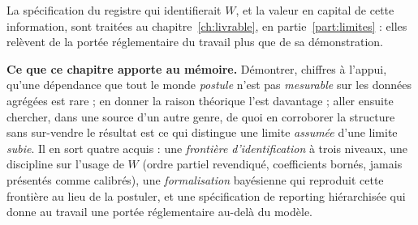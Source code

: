 La spécification du registre qui identifierait $W$, et la valeur en capital de cette
information, sont traitées au chapitre~\ref{ch:livrable}, en partie~\ref{part:limites} : elles
relèvent de la portée réglementaire du travail plus que de sa démonstration.

\begin{cle}
\textbf{Ce que ce chapitre apporte au mémoire.} Démontrer, chiffres à l'appui, qu'une dépendance
que tout le monde \emph{postule} n'est pas \emph{mesurable} sur les données agrégées est rare ;
en donner la raison théorique l'est davantage ; aller ensuite chercher, dans une source d'un
autre genre, de quoi en corroborer la structure sans sur-vendre le résultat est ce qui distingue
une limite \emph{assumée} d'une limite \emph{subie}. Il en sort quatre acquis : une
\emph{frontière d'identification} à trois niveaux, une discipline sur l'usage de $W$
(ordre partiel revendiqué, coefficients bornés, jamais présentés comme calibrés), une
\emph{formalisation} bayésienne qui reproduit cette frontière au lieu de la postuler, et une
spécification de reporting hiérarchisée qui donne au travail une portée réglementaire
au-delà du modèle.
\end{cle}



